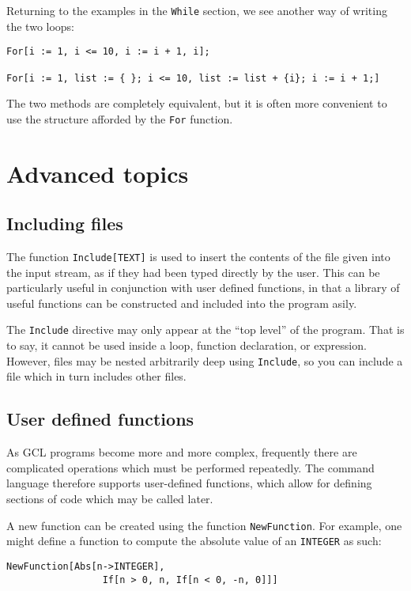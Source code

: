 Returning to the examples in the \verb+While+ section, we see another way
of writing the two loops:

\begin{verbatim}
For[i := 1, i <= 10, i := i + 1, i];

For[i := 1, list := { }; i <= 10, list := list + {i}; i := i + 1;]
\end{verbatim}

\noindent The two methods are completely equivalent, but it is often
more convenient to use the structure afforded by the \verb+For+ function.


\section{Advanced topics}

\subsection{Including files}

The function {\tt Include[TEXT]} is used to insert the contents of the file
given into the input stream, as if they had been typed directly by the user.
This can be particularly useful in conjunction with user defined functions, in that
a library of useful functions can be constructed and included into the program
asily.

The {\tt Include} directive may only appear at the ``top level'' of
the program.  That is to say, it cannot be used inside a loop,
function declaration, or expression.  However, files may be nested
arbitrarily deep using {\tt Include}, so you can include a file which
in turn includes other files.
  
\subsection{User defined functions}

As GCL programs become more and more complex, frequently there are complicated
operations which must be performed repeatedly.  The command language therefore
supports user-defined functions, which allow for defining sections of code
which may be called later.

A new function can be created using the function
\verb+NewFunction+.  For example, one might define a function to compute
the absolute value of an {\tt INTEGER} as such:

\begin{verbatim}
NewFunction[Abs[n->INTEGER],
                 If[n > 0, n, If[n < 0, -n, 0]]]
\end{verbatim}

